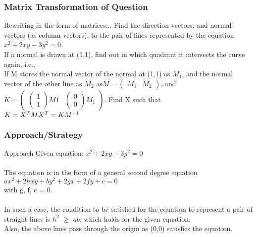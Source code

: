\documentclass{beamer}
\begin{document}
\begin{frame}
\frametitle{Matrix Transformation of Question}
\begin{block}{Rewriting in the form of matrices...}
Find the direction vectors, and normal vectors (as column vectors), to the pair of lines represented by the equation $x^2 + 2xy - 3y^2 = 0$. \\
If a normal is drawn at (1,1), find out in which quadrant it intersects the curve again, i.e.,\\
If M stores the normal vector of the normal at (1,1) as $M_1$, and the normal vector of the other line as $M_2$ as$M = \begin{pmatrix} M_1 & M_2 \end{pmatrix}$, and \\
$K = \begin{pmatrix} \begin{pmatrix} 1 \\ 1 \end{pmatrix}M1 & \begin{pmatrix}0\\0\end{pmatrix} M_1 \end{pmatrix}$. 
Find X such that \\
$K = X^T M \\
X^T = KM^{-1}$
\end{block}
\end{frame}


\begin{frame}
\frametitle{Approach/Strategy}
\begin{block}{Approach}
Given equation: $x^2 + 2xy - 3y^2 = 0$ \\
\\
The equation is in the form of a general second degree equation \\
$ax^2 + 2hxy + by^2 + 2gx + 2fy + c = 0$ \\
with g, f, c = 0. \\ 
\\
In such a case, the condition to be satisfied for the equation to represent a pair of straight lines is $h^2$ $\geq$ $ab$, which holds for the given equation. \\
Also, the above lines pass through the origin as (0,0) satisfies the equation. 
\end{block}
\end{frame}
\end{document}
